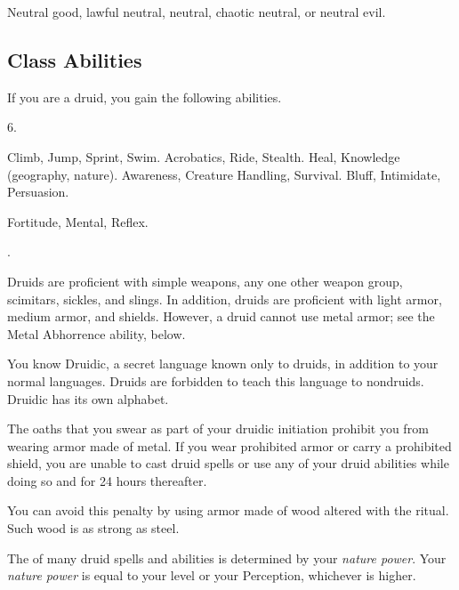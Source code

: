      Neutral good, lawful neutral, neutral, chaotic neutral, or neutral evil.

    \subsection{Class Abilities}
        If you are a druid, you gain the following abilities.

         6.

         Climb, Jump, Sprint, Swim.
         Acrobatics, Ride, Stealth.
         Heal, Knowledge (geography, nature).
         Awareness, Creature Handling, Survival.
         Bluff, Intimidate, Persuasion.

          Fortitude,  Mental,  Reflex.

         .

        Druids are proficient with simple weapons, any one other weapon group, scimitars, sickles, and slings.
        In addition, druids are proficient with light armor, medium armor, and shields.
        However, a druid cannot use metal armor; see the Metal Abhorrence ability, below.

        You know Druidic, a secret language known only to druids, in addition to your normal languages.
        Druids are forbidden to teach this language to nondruids.
        Druidic has its own alphabet.

        The oaths that you swear as part of your druidic initiation prohibit you from wearing armor made of metal.
        If you wear prohibited armor or carry a prohibited shield, you are unable to cast druid spells or use any of your  druid abilities while doing so and for 24 hours thereafter.
        
        You can avoid this penalty by using armor made of wood altered with the  ritual.
        Such wood is as strong as steel.

        The  of many druid spells and abilities is determined by your \textit{nature power}.
        Your \textit{nature power} is equal to your level or your Perception, whichever is higher.

